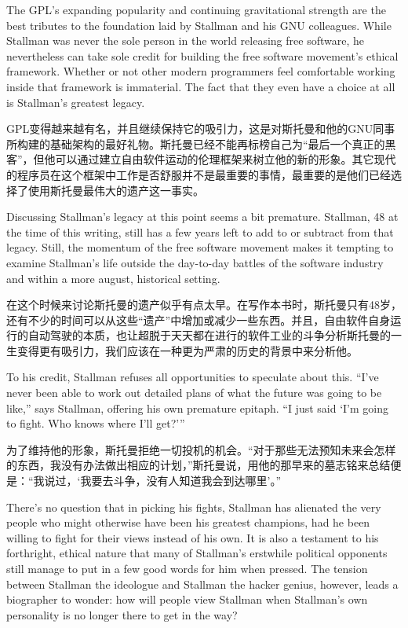 \ifdefined\eng
The GPL's expanding popularity and continuing gravitational strength are the best tributes to the foundation laid by Stallman and his GNU colleagues. While Stallman was never the sole person in the world releasing free software, he nevertheless can take sole credit for building the free software movement's ethical framework. Whether or not other modern programmers feel comfortable working inside that framework is immaterial. The fact that they even have a choice at all is Stallman's greatest legacy.
\fi

\ifdefined\chs
GPL变得越来越有名，并且继续保持它的吸引力，这是对斯托曼和他的GNU同事所构建的基础架构的最好礼物。斯托曼已经不能再标榜自己为“最后一个真正的黑客”，但他可以通过建立自由软件运动的伦理框架来树立他的新的形象。其它现代的程序员在这个框架中工作是否舒服并不是最重要的事情，最重要的是他们已经选择了使用斯托曼最伟大的遗产这一事实。
\fi

\ifdefined\eng
Discussing Stallman's legacy at this point seems a bit premature. Stallman, 48 at the time of this writing, still has a few years left to add to or subtract from that legacy. Still, the momentum of the free software movement makes it tempting to examine Stallman's life outside the day-to-day battles of the software industry and within a more august, historical setting.
\fi

\ifdefined\chs
在这个时候来讨论斯托曼的遗产似乎有点太早。在写作本书时，斯托曼只有48岁，还有不少的时间可以从这些“遗产”中增加或减少一些东西。并且，自由软件自身运行的自动驾驶的本质，也让超脱于天天都在进行的软件工业的斗争分析斯托曼的一生变得更有吸引力，我们应该在一种更为严肃的历史的背景中来分析他。
\fi

\ifdefined\eng
To his credit, Stallman refuses all opportunities to speculate about this. ``I've never been able to work out detailed plans of what the future was going to be like,'' says Stallman, offering his own premature epitaph. ``I just said `I'm going to fight. Who knows where I'll get?'\hspace{0.01in}''
\fi

\ifdefined\chs
为了维持他的形象，斯托曼拒绝一切投机的机会。“对于那些无法预知未来会怎样的东西，我没有办法做出相应的计划，”斯托曼说，用他的那早来的墓志铭来总结便是：“我说过，‘我要去斗争，没有人知道我会到达哪里’。”
\fi

\ifdefined\eng
There's no question that in picking his fights, Stallman has alienated the very people who might otherwise have been his greatest champions, had he been willing to fight for their views instead of his own. It is also a testament to his forthright, ethical nature that many of Stallman's erstwhile political opponents still manage to put in a few good words for him when pressed. The tension between Stallman the ideologue and Stallman the hacker genius, however, leads a biographer to wonder: how will people view Stallman when Stallman's own personality is no longer there to get in the way?
\fi

